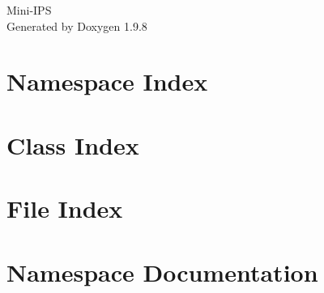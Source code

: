 \documentclass[twoside]{book}
\newcommand{\+}{\discretionary{\mbox{\scriptsize$\hookleftarrow$}}{}{}}
\newcommand{\clearemptydoublepage}{%
    \newpage{\pagestyle{empty}\cleardoublepage}%
  }
\begin{document}
  \raggedbottom
    \hypersetup{pageanchor=false,
                bookmarksnumbered=true,
                pdfencoding=unicode
               }
  \begin{titlepage}
  \vspace*{7cm}
  \begin{center}%
  {\Large Mini-\/\+IPS}\\
  \vspace*{1cm}
  {\large Generated by Doxygen 1.9.8}\\
  \end{center}
  \end{titlepage}
  \clearemptydoublepage
  \tableofcontents
  \clearemptydoublepage
  \hypersetup{pageanchor=true}


\chapter{Namespace Index}

\chapter{Class Index}

\chapter{File Index}

\chapter{Namespace Documentation}





\end{document}
